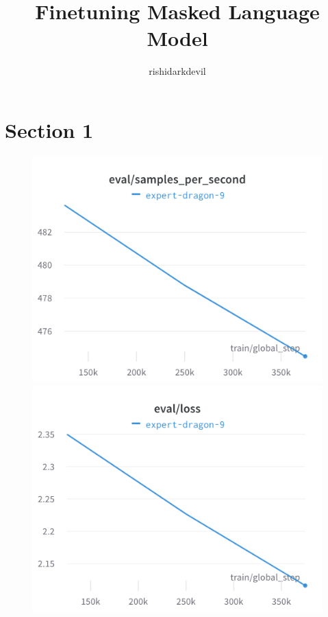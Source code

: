 \documentclass{article}
\title{Finetuning Masked Language Model}
\author{%
rishidarkdevil
}
\begin{document}
\maketitle

\section{Section 1}

\begin{figure}[!htb]
\includegraphics[width=\linewidth]{charts/Section-2-Panel-0-7n7zpgc99}
\caption{}
\endminipage\hfill
{}
\includegraphics[width=\linewidth]{charts/Section-2-Panel-1-9e5z6w6x1}
\caption{}
\endminipage
\end{figure}
\end{document}
